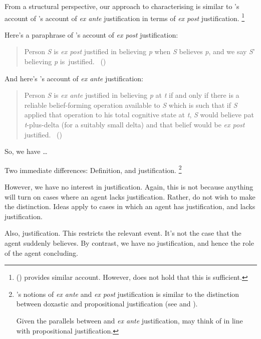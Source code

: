 \begin{note}
  From a structural perspective, our approach to characterising  is similar to \citeauthor{Goldman:1979ui}'s account of \citeauthor{Goldman:1979ui}'s account of \emph{ex ante} justification in terms of \emph{ex post} justification.%
  \footnote{
    \citeauthor{Turri:2010aa} (\citeyear{Turri:2010aa}) provides similar account.
    However, \citeauthor{Turri:2010aa} does not hold that this is sufficient.
  }

  Here's a paraphrase of \citeauthor{Goldman:1979ui}'s account of \emph{ex post} justification:
  \begin{quote}
    Person \emph{S} is \emph{ex post} justified in believing \emph{p} when \emph{S} believes \emph{p}, and we say \emph{S}' believing \emph{p} is~justified.%
    \mbox{ }\hfill\mbox{(\citeyear[Cf.][21]{Goldman:1979ui})}
  \end{quote}
  And here's \citeauthor{Goldman:1979ui}'s account of \emph{ex ante} justification:
  \begin{quote}
    Person \emph{S} is \emph{ex ante} justified in believing \emph{p} at \emph{t} if and only if there is a reliable belief-forming operation available to \emph{S} which is such that if \emph{S} applied that operation to his total cognitive state at \emph{t}, \emph{S} would believe pat \emph{t}-plus-delta (for a suitably small delta) and that belief would be \emph{ex post} justified.%
    \mbox{ }\hfill\mbox{(\citeyear[21]{Goldman:1979ui})}
  \end{quote}
  So, we have \dots

  Two immediate differences: Definition, and justification.%
  \footnote{
    \citeauthor{Goldman:1979ui}'s notions of \emph{ex ante} and \emph{ex post} justification is similar to the distinction between doxastic and propositional justification (see \cite{Firth:1978vi} and \cite[esp.\ fn.1]{Silva:2020aa}).

    Given the parallels between  and \emph{ex ante} justification, may think of  in line with propositional justification.
  }

  However, we have no interest in justification.
  Again, this is not because anything will turn on cases where an agent lacks justification.
  Rather, do not wish to make the distinction.
  Ideas apply to cases in which an agent has justification, and lacks justification.

  {
    \color{red}
    Also, justification.
    This restricts the relevant event.
    It's not the case that the agent suddenly believes.
    By contrast, we have no justification, and hence the role of the agent concluding.
  }
\end{note}


